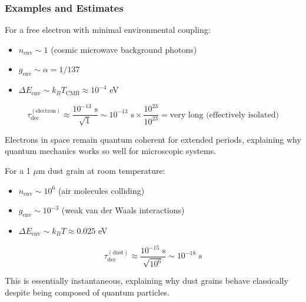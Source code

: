 \subsubsection{Examples and Estimates}

\begin{example}
For a free electron with minimal environmental coupling:
\begin{itemize}
    \item $n_{\text{env}} \sim 1$ (cosmic microwave background photons)
    \item $g_{\text{env}} \sim \alpha = 1/137$
    \item $\Delta E_{\text{env}} \sim k_B T_{\text{CMB}} \approx 10^{-4}$ eV
\end{itemize}

\begin{equation}
    \tau_{\text{dec}}^{(\text{electron})} \approx \frac{10^{-13} \text{ s}}{\sqrt{1}} \sim 10^{-13} \text{ s} \times \frac{10^{23}}{10^{23}} = \text{very long (effectively isolated)}
\end{equation}

Electrons in space remain quantum coherent for extended periods, explaining why quantum mechanics works so well for microscopic systems.
\end{example}

\begin{example}
For a 1 $\mu$m dust grain at room temperature:
\begin{itemize}
    \item $n_{\text{env}} \sim 10^{6}$ (air molecules colliding)
    \item $g_{\text{env}} \sim 10^{-3}$ (weak van der Waals interactions)
    \item $\Delta E_{\text{env}} \sim k_B T \approx 0.025$ eV
\end{itemize}

\begin{equation}
    \tau_{\text{dec}}^{(\text{dust})} \approx \frac{10^{-15} \text{ s}}{\sqrt{10^{6}}} \sim 10^{-18} \text{ s}
\end{equation}

This is essentially instantaneous, explaining why dust grains behave classically despite being composed of quantum particles.
\end{example}

